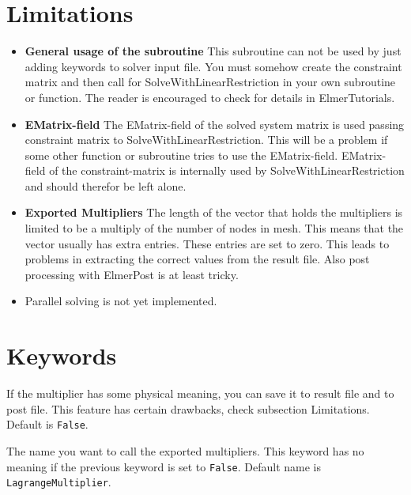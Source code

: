 \section{Limitations}
\begin{itemize}
\item \textbf{General usage of the subroutine} \newline
This subroutine can not be used by just adding keywords to solver input file.
You must somehow create the constraint matrix and then call for SolveWithLinearRestriction
in your own subroutine or function. The reader is encouraged to check for details
in ElmerTutorials.

\item \textbf{EMatrix-field} \newline
The EMatrix-field of the solved system matrix is used passing constraint matrix to
SolveWithLinearRestriction. This will be a problem if some other function or subroutine
tries to use the EMatrix-field. EMatrix-field of the constraint-matrix is internally
used by SolveWithLinearRestriction and should therefor be left alone.

\item \textbf{Exported Multipliers} \newline
The length of the vector that holds the multipliers is limited to be a multiply
of the number of nodes in mesh. This means that the vector usually has extra entries.
These entries are set to zero. This leads to problems in extracting the correct 
values from the result file. Also post processing with ElmerPost is at least tricky.

\item Parallel solving is not yet implemented.

\end{itemize}

\section{Keywords}

\sifbegin
  \sifbegin
    If the multiplier has some physical meaning, you can save it to result file
    and to post file. This feature has certain drawbacks, check subsection Limitations.
    Default is {\tt False}.

    The name you want to call the exported multipliers. This keyword has no meaning if
    the previous keyword is set to {\tt False}. Default name is 
{\tt LagrangeMultiplier}.
  \sifend
\sifend





